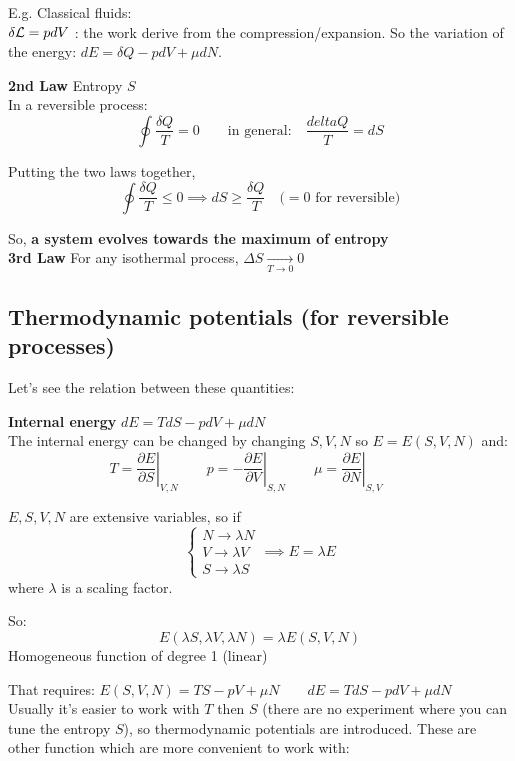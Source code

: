 E.g. Classical fluids:\\
$\delta\mathcal{L} = pdV$ : the work derive from the compression/expansion. So the variation of the energy: $dE = \delta Q - pdV + \mu dN$.

\textbf{2nd Law} Entropy $S$\\

In a reversible process: 
$$ \oint \frac{\delta Q}T = 0 \qquad \text{in general:} \quad \frac{delta Q}T = dS$$

Putting the two laws together,
$$ \oint \frac{\delta Q}T \le 0 \implies dS \ge \frac{\delta Q}T \quad (= 0 \text{ for reversible)}$$ 

So, \textbf{a system evolves towards the maximum of entropy}\\

\textbf{3rd Law} For any isothermal process, $\Delta S \xrightarrow[T\to 0]{}0$

\subsection{Thermodynamic potentials (for reversible processes)}
Let's see the relation between these quantities:

\textbf{Internal energy} $dE = TdS - pdV + \mu dN$\\
The internal energy can be changed by changing $S, V, N$ so $E = E(S,V,N)$ and:
$$ T = \left.\frac{\partial E}{\partial S}\right|_{V,N} \qquad
   p = -\left.\frac{\partial E}{\partial V}\right|_{S,N} \qquad
   \mu = \left.\frac{\partial E}{\partial N}\right|_{S,V} \qquad
$$


$E, S, V, N$ are extensive variables, so if 
$$ \begin{cases}N \rightarrow \lambda N\\V \rightarrow \lambda V\\S \rightarrow \lambda S\end{cases} \implies E = \lambda E
$$
where $\lambda$ is a scaling factor.

So:
$$ \boxed{E(\lambda S, \lambda V, \lambda N) = \lambda E(S,V,N) }$$
Homogeneous function of degree 1 (linear)

That requires: $E(S,V,N) = TS - pV + \mu N \qquad dE = TdS - pdV + \mu dN$\\

Usually it's easier to work with $T$ then $S$ (there are no experiment where you can tune the entropy $S$), so thermodynamic potentials are introduced. These are other function which are more convenient to work with:

